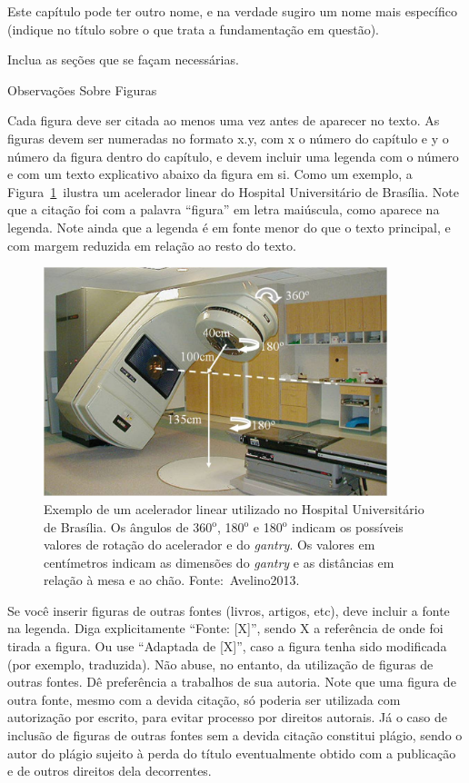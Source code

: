 \documentclass[a4paper, 12pt]{ppgeb}
\makeatletter
\renewcommand{\section}{\@startsection
{section}
{1}
{0mm}
{-\baselineskip}
{0.5\baselineskip}
{\large\bfseries\scshape}}
\makeatother
\begin{document}
Este capítulo pode ter outro nome, e na verdade sugiro um nome mais específico (indique no título sobre o que trata a fundamentação em questão).

Inclua as seções que se façam necessárias.

\section{Observações Sobre Figuras}

Cada figura deve ser citada ao menos uma vez antes de aparecer no texto. As figuras devem ser numeradas no formato x.y, com x o número do capítulo e y o número da figura dentro do capítulo, e devem incluir uma legenda com o número e com um texto explicativo abaixo da figura em si. Como um exemplo, a Figura~\ref{fig:acelerador} ilustra um acelerador linear do Hospital Universitário de Brasília. Note que a citação foi com a palavra ``figura'' em letra maiúscula, como aparece na legenda. Note ainda que a legenda é em fonte menor do que o texto principal, e com margem reduzida em relação ao resto do texto.

\begin{figure}[h]
\centering
\includegraphics[width=100mm]{Acelerador2}
\caption[Exemplo de um acelerador linear utilizado no Hospital Universitário de Brasília.]{Exemplo de um acelerador linear utilizado no Hospital Universitário de Brasília. Os ângulos de 360${^{\textrm{o}} }$, 180${^{\textrm{o}} }$ e 180${^{\textrm{o}} }$ indicam os possíveis valores de rotação do acelerador e do \emph{gantry}. Os valores em centímetros indicam as dimensões do \emph{gantry} e as distâncias em relação à mesa e ao chão. Fonte:~\cite{mainreferences}{Avelino2013}.}\label{fig:acelerador}
\end{figure}

Se você inserir figuras de outras fontes (livros, artigos, etc), deve incluir a fonte na legenda. Diga explicitamente ``Fonte: [X]'', sendo X a referência de onde foi tirada a figura. Ou use ``Adaptada de [X]'', caso a figura tenha sido modificada (por exemplo, traduzida). Não abuse, no entanto, da utilização de figuras de outras fontes. Dê preferência a trabalhos de sua autoria. Note que uma figura de outra fonte, mesmo com a devida citação, só poderia ser utilizada com autorização por escrito, para evitar processo por direitos autorais. Já o caso de inclusão de figuras de outras fontes sem a devida citação constitui plágio, sendo o autor do plágio sujeito à perda do título eventualmente obtido com a publicação e de outros direitos dela decorrentes.
\end{document}
